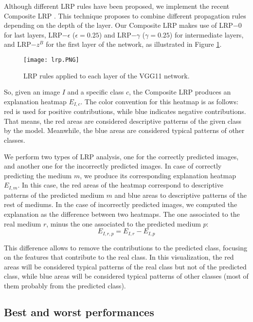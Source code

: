 \documentclass{article}
\begin{document}
Although different LRP rules have been proposed, we implement the recent Composite LRP \citep{overview}. This technique proposes to combine different propagation rules depending on the depth of the layer. Our Composite LRP makes use of LRP$ - 0$ for last layers, LRP$ - \epsilon$ ($\epsilon = 0.25$) and LRP$ - \gamma$ ($\gamma = 0.25$) for intermediate layers, and LRP$-z^B$ for the first layer of the network, as illustrated in Figure \ref{fig:lrp}.

\begin{figure}[t!]
    \centering
    \texttt{[image: lrp.PNG]}
    \caption{LRP rules applied to each layer of the VGG11 network.}
    \label{fig:lrp}
\end{figure}

So, given an image $I$ and a specific class $c$, the Composite LRP produces an explanation heatmap $E_{I,c}$. The color convention for this heatmap is as follows: red is used for positive contributions, while blue indicates negative contributions. That means, the red areas are considered descriptive patterns of the given class by the model. Meanwhile, the blue areas are considered typical patterns of other classes.

We perform two types of LRP analysis, one for the correctly predicted images, and another one for the incorrectly predicted images. In case of correctly predicting the medium $m$, we produce its corresponding explanation heatmap $E_{I,m}$. In this case, the red areas of the heatmap correspond to descriptive patterns of the predicted medium $m$ and blue areas to descriptive patterns of the rest of mediums. In the case of incorrectly predicted images, we computed the explanation as the difference between two heatmaps. The one associated to the real medium $r$, minus the one associated to the predicted medium $p$:
\begin{equation}
    E_{I,r,p} = E_{I,r} - E_{I,p}
\end{equation}

This difference allows to remove the contributions to the predicted class, focusing on the features that contribute to the real class. In this visualization, the red areas will be considered typical patterns of the real class but not of the predicted class, while blue areas will be considered typical patterns of other classes (most of them probably from the predicted class).

\subsection{Best and worst performances} \label{sec:exp_crc}
\end{document}
